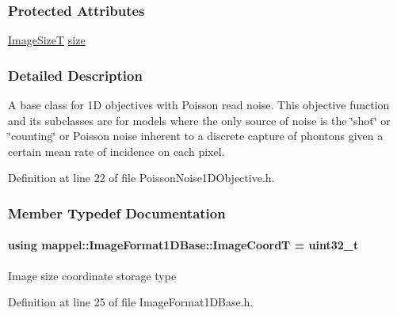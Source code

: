 \subsubsection*{Protected Attributes}
\begin{DoxyCompactItemize}
\item 
\hyperlink{classmappel_1_1ImageFormat1DBase_a6456bab2b26702022ee32ae19e90dcac}{Image\+SizeT} \hyperlink{classmappel_1_1ImageFormat1DBase_a8941b4d028e4dd881146a7c1b9039bb1}{size}
\end{DoxyCompactItemize}


\subsubsection{Detailed Description}
A base class for 1D objectives with Poisson read noise. This objective function and its subclasses are for models where the only source of noise is the \char`\"{}shot\char`\"{} or \char`\"{}counting\char`\"{} or Poisson noise inherent to a discrete capture of phontons given a certain mean rate of incidence on each pixel. 



Definition at line 22 of file Poisson\+Noise1\+D\+Objective.\+h.



\subsubsection{Member Typedef Documentation}
\paragraph[{\texorpdfstring{Image\+CoordT}{ImageCoordT}}]{\setlength{\rightskip}{0pt plus 5cm}using {\bf mappel\+::\+Image\+Format1\+D\+Base\+::\+Image\+CoordT} =  uint32\+\_\+t\hspace{0.3cm}{\ttfamily [inherited]}}\hypertarget{classmappel_1_1ImageFormat1DBase_a82ab3168eb1a87eaeb3e7c919188e9fc}{}\label{classmappel_1_1ImageFormat1DBase_a82ab3168eb1a87eaeb3e7c919188e9fc}
Image size coordinate storage type 

Definition at line 25 of file Image\+Format1\+D\+Base.\+h.

